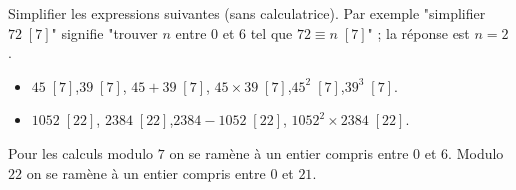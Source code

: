 \documentclass[11pt,class=report,crop=false]{standalone}
\begin{document}
    




\bigskip
\bigskip





\exercice{}

\enonce
Simplifier les expressions suivantes (sans calculatrice). Par exemple "simplifier $72 \; [7]$" signifie "trouver $n$ entre $0$ et $6$ tel que $72 \equiv n \; [7]$" ; la réponse est $n=2$.
\begin{itemize}
    \item $45 \; [7]$,\quad $39 \; [7]$, \quad $45+39 \; [7]$, \quad $45 \times 39 \; [7]$,\quad $45^2 \; [7]$,\quad  $39^3 \; [7]$.
    \item $1052 \; [22]$, \quad $2384 \; [22]$,\quad  $2384-1052 \; [22]$, \quad $1052^2 \times 2384 \; [22]$.
\end{itemize} 
\finenonce

\indication
Pour les calculs modulo $7$ on se ramène à un entier compris entre $0$ et $6$.
Modulo $22$ on se ramène à un entier compris entre $0$ et $21$.
\finindication
\end{document}
